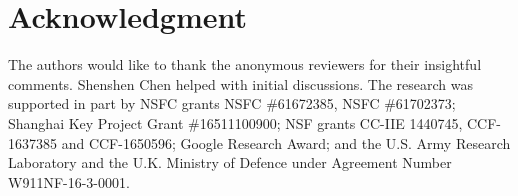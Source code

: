 \section{Acknowledgment}

The authors would like to thank the anonymous reviewers for their insightful comments. Shenshen Chen helped with initial discussions. The research was supported in part by NSFC grants NSFC \#61672385, NSFC \#61702373; Shanghai Key Project Grant \#16511100900; NSF grants CC-IIE 1440745, CCF-1637385 and CCF-1650596; Google Research Award; and the U.S. Army Research Laboratory and the U.K. Ministry of Defence under Agreement Number W911NF-16-3-0001.

